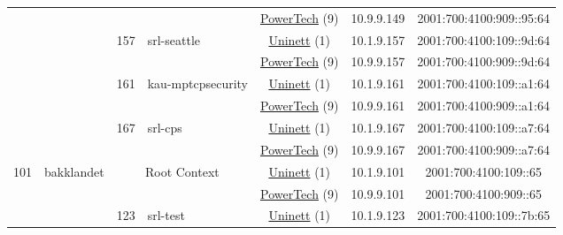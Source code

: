 \begin{small}
\begin{center}
\begin{longtable}{|c|c|c|c|c|c|c|c|}
  &  &  &  & \multicolumn{2}{|c|}{\tiny{\href{http://www.powertech.no}{PowerTech} (9)}} & \tiny{10.9.9.149} & \tiny{2001:700:4100:909::95:64} \\* \cline{3-3}\cline{4-4}\cline{5-5}\cline{6-6}\cline{7-7}\cline{8-8}
  &  & \multirow{2}{*}{\tiny{157}} & \multicolumn{1}{|l|}{\multirow{2}{*}{\tiny{srl-seattle}}} & \multicolumn{2}{|c|}{\tiny{\href{https://www.uninett.no}{Uninett} (1)}} & \tiny{10.1.9.157} & \tiny{2001:700:4100:109::9d:64} \\* \cline{5-5}\cline{6-6}\cline{7-7}\cline{8-8}
  &  &  &  & \multicolumn{2}{|c|}{\tiny{\href{http://www.powertech.no}{PowerTech} (9)}} & \tiny{10.9.9.157} & \tiny{2001:700:4100:909::9d:64} \\* \cline{3-3}\cline{4-4}\cline{5-5}\cline{6-6}\cline{7-7}\cline{8-8}
  &  & \multirow{2}{*}{\tiny{161}} & \multicolumn{1}{|l|}{\multirow{2}{*}{\tiny{kau-mptcpsecurity}}} & \multicolumn{2}{|c|}{\tiny{\href{https://www.uninett.no}{Uninett} (1)}} & \tiny{10.1.9.161} & \tiny{2001:700:4100:109::a1:64} \\* \cline{5-5}\cline{6-6}\cline{7-7}\cline{8-8}
  &  &  &  & \multicolumn{2}{|c|}{\tiny{\href{http://www.powertech.no}{PowerTech} (9)}} & \tiny{10.9.9.161} & \tiny{2001:700:4100:909::a1:64} \\* \cline{3-3}\cline{4-4}\cline{5-5}\cline{6-6}\cline{7-7}\cline{8-8}
  &  & \multirow{2}{*}{\tiny{167}} & \multicolumn{1}{|l|}{\multirow{2}{*}{\tiny{srl-cps}}} & \multicolumn{2}{|c|}{\tiny{\href{https://www.uninett.no}{Uninett} (1)}} & \tiny{10.1.9.167} & \tiny{2001:700:4100:109::a7:64} \\* \cline{5-5}\cline{6-6}\cline{7-7}\cline{8-8}
  &  &  &  & \multicolumn{2}{|c|}{\tiny{\href{http://www.powertech.no}{PowerTech} (9)}} & \tiny{10.9.9.167} & \tiny{2001:700:4100:909::a7:64} \\ \hline
 \multirow{20}{*}{\tiny{101}} & \multicolumn{1}{|l|}{\multirow{20}{*}{\tiny{bakklandet}}} & \multicolumn{2}{|c|}{\multirow{2}{*}{\tiny{Root Context}}} & \multicolumn{2}{|c|}{\tiny{\href{https://www.uninett.no}{Uninett} (1)}} & \tiny{10.1.9.101} & \tiny{2001:700:4100:109::65} \\* \cline{5-5}\cline{6-6}\cline{7-7}\cline{8-8}
  &  & \multicolumn{2}{|c|}{} & \multicolumn{2}{|c|}{\tiny{\href{http://www.powertech.no}{PowerTech} (9)}} & \tiny{10.9.9.101} & \tiny{2001:700:4100:909::65} \\* \cline{3-3}\cline{4-4}\cline{5-5}\cline{6-6}\cline{7-7}\cline{8-8}
  &  & \multirow{2}{*}{\tiny{123}} & \multicolumn{1}{|l|}{\multirow{2}{*}{\tiny{srl-test}}} & \multicolumn{2}{|c|}{\tiny{\href{https://www.uninett.no}{Uninett} (1)}} & \tiny{10.1.9.123} & \tiny{2001:700:4100:109::7b:65} \\* \cline{5-5}\cline{6-6}\cline{7-7}\cline{8-8}

\end{longtable}
\end{center}
\end{small}
